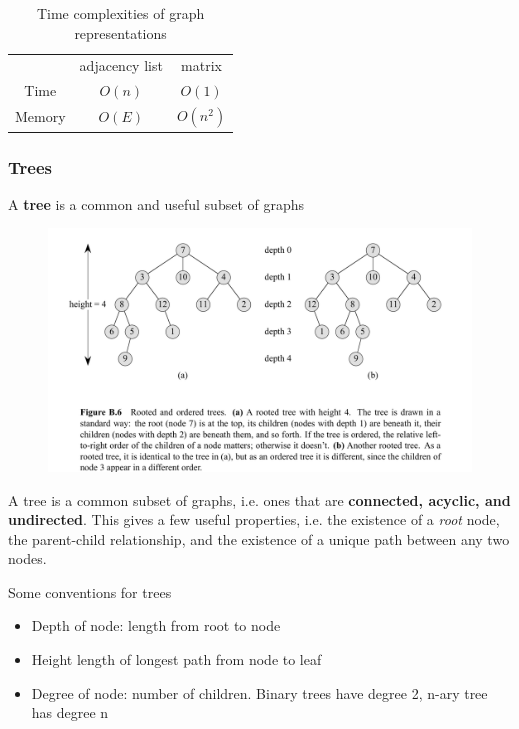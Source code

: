 \documentclass[../notes.tex]{subfiles}
\begin{document}
\begin{table}[H]
	\centering
	\caption{Time complexities of graph representations}
	\begin{tabular}{c|c|c|}
		\hline
		& adjacency list & matrix  \\
		Time & $ O(n) $ & $O(1)$ \\ 
		Memory & $ O(E) $ & $ O(n^2) $ 
	\end{tabular}
\end{table}












\subsubsection{Trees}

A \textbf{tree} is a common and useful subset of graphs
\begin{figure}[H]
	\centering
	\includegraphics[width=0.8\linewidth]{img/image_2022-09-22-00-39-29.png}
\end{figure}
\begin{definition}
	A tree is a common subset of graphs, i.e. ones that are \textbf{connected, acyclic, and undirected}.
	This gives a few useful properties, i.e. the existence of a \textit{root} node, the parent-child relationship, and the existence of a unique path between any two nodes.
\end{definition}

Some conventions for trees

\begin{itemize}
	\item Depth of node: length from root to node
	\item Height length of longest path from node to leaf
	\item Degree of node: number of children. Binary trees have degree 2, n-ary tree has degree n
\end{itemize}
\end{document}
